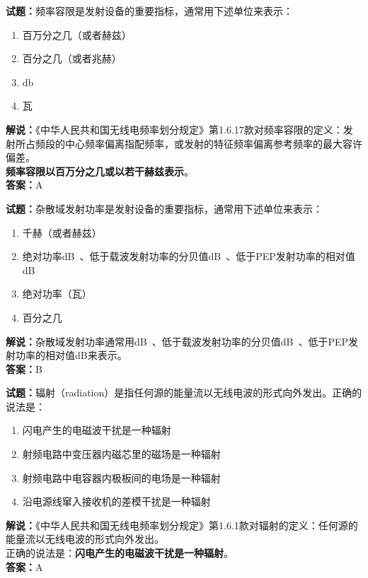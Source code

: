 \documentclass{ctexbook}
\begin{document}
\bigskip

\noindent\textbf{试题：}频率容限是发射设备的重要指标，通常用下述单位来表示：
\begin{enumerate}[leftmargin=3em]
  \item 百万分之几（或者赫兹）
  \item 百分之几（或者兆赫）
  \item \unit{\decibel}
  \item 瓦
\end{enumerate}
\noindent\textbf{解说：}《中华人民共和国无线电频率划分规定》第1.6.17款对频率容限的定义：发射所占频段的中心频率偏离指配频率，或发射的特征频率偏离参考频率的最大容许偏差。\\\textbf{频率容限以百万分之几或以若干赫兹表示}。\\\noindent\textbf{答案：}A

\bigskip

\noindent\textbf{试题：}杂散域发射功率是发射设备的重要指标，通常用下述单位来表示：
\begin{enumerate}[leftmargin=3em]
  \item 千赫（或者赫兹）
  \item 绝对功率\unit[qualifier-mode=combine]{\deci\bel{}}、低于载波发射功率的分贝值\unit[qualifier-mode=combine]{\deci\bel{}}、低于PEP发射功率的相对值\unit{\dB}
  \item 绝对功率（瓦）
  \item 百分之几
\end{enumerate}
\noindent\textbf{解说：}杂散域发射功率通常用\unit[qualifier-mode=combine]{\deci\bel{}}、低于载波发射功率的分贝值\unit[qualifier-mode=combine]{\deci\bel{}}、低于PEP发射功率的相对值\unit{\dB}来表示。\\\noindent\textbf{答案：}B

\bigskip

\noindent\textbf{试题：}辐射（radiation）是指任何源的能量流以无线电波的形式向外发出。正确的说法是：
\begin{enumerate}[leftmargin=3em]
  \item 闪电产生的电磁波干扰是一种辐射
  \item 射频电路中变压器内磁芯里的磁场是一种辐射
  \item 射频电路中电容器内极板间的电场是一种辐射
  \item 沿电源线窜入接收机的差模干扰是一种辐射
\end{enumerate}
\textbf{解说：}《中华人民共和国无线电频率划分规定》第1.6.1款对辐射的定义：任何源的能量流以无线电波的形式向外发出。\\正确的说法是：\textbf{闪电产生的电磁波干扰是一种辐射}。\\\noindent\textbf{答案：}A
\end{document}
